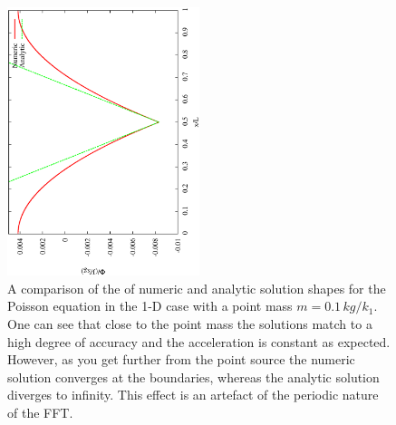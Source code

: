 \documentclass[10pt,a4paper]{article}
\begin{document}
\begin{figure}[h!]
\begin{center}
\includegraphics[width =0.5\textwidth, angle =-90]{singleAnalytic.eps}
\caption{A comparison of the of numeric and analytic solution shapes for the Poisson equation in the 1-D case with a point mass $m = 0.1\, kg/k_1$. One can see that close to the point mass the solutions match to a high degree of accuracy and the acceleration is constant as expected. However, as you get further from the point source the numeric solution converges at the boundaries, whereas the analytic solution diverges to infinity. This effect is an artefact of the periodic nature of the FFT. }
\label{fig:SingleAnalytic}
\end{center}
\end{figure}
\end{document}

